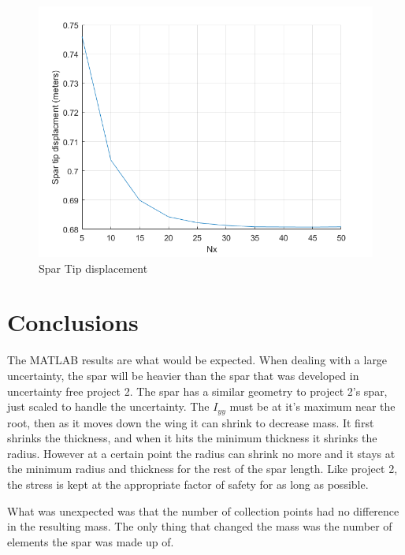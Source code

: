 \documentclass[12pt]{article}
\begin{document}
	\begin{figure}
		\centering
		\includegraphics[width=0.7\linewidth]{tipDisplacment}
		\caption{Spar Tip displacement}
		\label{fig:tipdisplacment}
	\end{figure}
	
	
	
	


	

	
	\section{Conclusions}
	
	The MATLAB results are what would be expected. When dealing with a large uncertainty, the spar will be heavier than the spar that was developed in uncertainty free project 2. The spar has a similar geometry to project 2's spar, just scaled to handle the uncertainty. The $I_{yy}$ must be at it's maximum near the root, then as it moves down the wing it can shrink to decrease mass. It first shrinks the thickness, and when it hits the minimum thickness it shrinks the radius. However at a certain point the radius can shrink no more and it stays at the minimum radius and thickness for the rest of the spar length. Like project 2, the stress is kept at the appropriate factor of safety for as long as possible.\par 
	
	What was unexpected was that the number of collection points had no difference in the resulting mass. The only thing that changed the mass was the number of elements the spar was made up of. 
	
\end{document}
